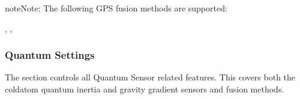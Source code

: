 \documentclass[letterpaper,10pt,english]{sphinxmanual}
\begin{document}
\begin{sphinxadmonition}{note}{Note:}
\sphinxAtStartPar
The following GPS fusion methods are supported:
\begin{description}
\sphinxAtStartPar
{}, , 

\end{description}
\end{sphinxadmonition}


\subsubsection{Quantum Settings}
\label{\detokenize{usage/configuration:quantum-settings}}
\sphinxAtStartPar
The  section controls all Quantum Sensor related features. This covers both the cold\sphinxhyphen{}atom quantum
inertia and gravity gradient sensors and fusion methods.
\end{document}
